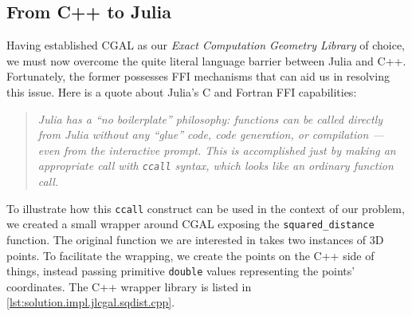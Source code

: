 \subsection{From C++ to Julia}%
\label{sec:solution.impl.jlcgal}


Having established \ac{CGAL} as our \textit{Exact Computation Geometry Library}
of choice, we must now overcome the quite literal language barrier between Julia
and C++.  Fortunately, the former possesses \ac{FFI} mechanisms that can aid us
in resolving this issue.  Here is a quote about Julia's C and Fortran \ac{FFI}
capabilities:

\begin{quote}
  \itshape\color{gray}
  Julia has a ``no boilerplate'' philosophy: functions can be called directly
  from Julia without any ``glue'' code, code generation, or compilation --- even
  from the interactive prompt.  This is accomplished just by making an
  appropriate call with \texttt{ccall} syntax, which looks like an
  ordinary function call.
\end{quote}

To illustrate how this \texttt{ccall} construct can be used in the
context of our problem, we created a small wrapper around \ac{CGAL} exposing the
\texttt{squared\_distance} function.  The original function we are interested in
takes two instances of 3D points.  To facilitate the wrapping, we create the
points on the C++ side of things, instead passing primitive \texttt{double}
values representing the points' coordinates.  The C++ wrapper library is listed
in \cref{lst:solution.impl.jlcgal.sqdist.cpp}.

